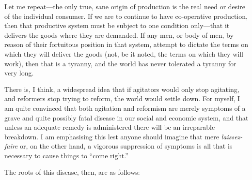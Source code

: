 \documentclass{book}
\begin{document}
Let me repeat—the only true, sane origin of production is the real need or desire of the individual consumer. If we are to continue to have co-operative production, then that productive system must be subject to one condition only—that it delivers the goods where they are demanded. If any men, or body of men, by reason of their fortuitous position in that system, attempt to dictate the terms on which they will deliver the goods (not, be it noted, the terms on which they will work), then that is a tyranny, and the world has never tolerated a tyranny for very long.

There is, I think, a widespread idea that if agitators would only stop agitating, and reformers stop trying to reform, the world would settle down. For myself, I am quite convinced that both agitation and reformism are merely symptoms of a grave and quite possibly fatal disease in our social and economic system, and that unless an adequate remedy is administered there will be an irreparable breakdown. I am emphasising this lest anyone should imagine that mere \emph{laissez-faire} or, on the other hand, a vigorous suppression of symptoms is all that is necessary to cause things to “come right.”

The roots of this disease, then, are as follows:
\end{document}
